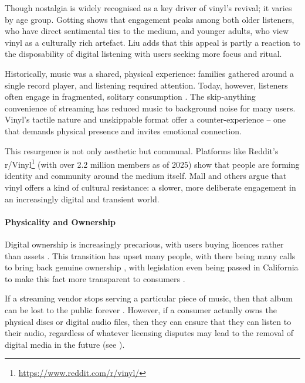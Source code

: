                 Though nostalgia is widely recognised as a key driver of vinyl's revival; it varies by age group. Gotting \cite{Gotting2021} shows that engagement peaks among both older listeners, who have direct sentimental ties to the medium, and younger adults, who view vinyl as a culturally rich artefact. Liu \cite{Liu2020} adds that this appeal is partly a reaction to the disposability of digital listening with users seeking more focus and ritual.
    
                Historically, music was a shared, physical experience: families gathered around a single record player, and listening required attention. Today, however, listeners often engage in fragmented, solitary consumption \cite{historyandrevivalofvinyls}. The skip-anything convenience of streaming has reduced music to background noise for many users. Vinyl's tactile nature and unskippable format offer a counter-experience -- one that demands physical presence and invites emotional connection.
    
                This resurgence is not only aesthetic but communal. Platforms like Reddit's r/Vinyl\footnote{\url{https://www.reddit.com/r/vinyl/}} (with over 2.2 million members as of 2025) show that people are forming identity and community around the medium itself. Mall \cite{vinylRevival} and others argue that vinyl offers a kind of cultural resistance: a slower, more deliberate engagement in an increasingly digital and transient world.
          
            \paragraph{Physicality and Ownership} %
    
                Digital ownership is increasingly precarious, with users buying licences rather than assets \cite{verge2024steam_license}. This transition has upset many people, with there being many calls to bring back genuine ownership \cite{stanton2024gamers_pushback}, with legislation even being passed in California to make this fact more transparent to consumers \cite{california2024ab2426}.
    
                If a streaming vendor stops serving a particular piece of music, then that album can be lost to the public forever \cite{polygon2024cartoon_network_delisting}. However, if a consumer actually owns the physical discs or digital audio files, then they can ensure that they can listen to their audio, regardless of whatever licensing disputes may lead to the removal of digital media in the future (see \cite{bains2022lotr_strategy}).
    
